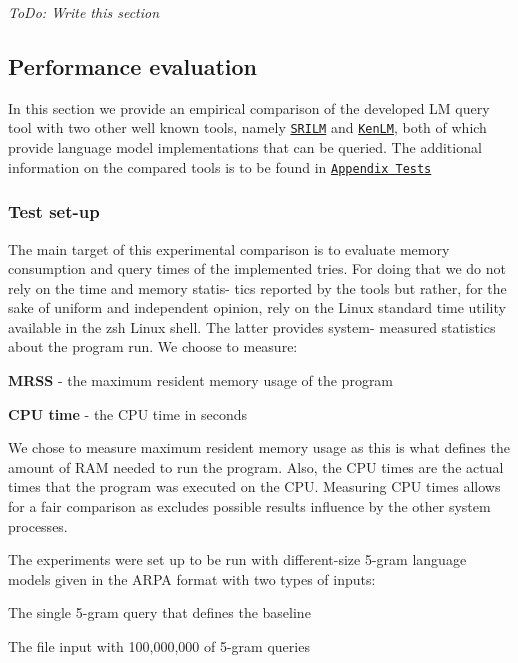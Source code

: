 {\itshape To\+Do\+: Write this section}

\subsection*{Performance evaluation}

In this section we provide an empirical comparison of the developed L\+M query tool with two other well known tools, namely \href{http://www.speech.sri.com/projects/srilm/}{\tt S\+R\+I\+L\+M} and \href{https://kheafield.com/code/kenlm/}{\tt Ken\+L\+M}, both of which provide language model implementations that can be queried. The additional information on the compared tools is to be found in \href{#appendix-tests}{\tt Appendix Tests}

\subsubsection*{Test set-\/up}

The main target of this experimental comparison is to evaluate memory consumption and query times of the implemented tries. For doing that we do not rely on the time and memory statis-\/ tics reported by the tools but rather, for the sake of uniform and independent opinion, rely on the Linux standard time utility available in the {\ttfamily zsh} Linux shell. The latter provides system-\/ measured statistics about the program run. We choose to measure\+:


\begin{DoxyItemize}
\item {\bfseries M\+R\+S\+S} -\/ the maximum resident memory usage of the program
\item {\bfseries C\+P\+U time} -\/ the C\+P\+U time in seconds
\end{DoxyItemize}

We chose to measure maximum resident memory usage as this is what defines the amount of R\+A\+M needed to run the program. Also, the C\+P\+U times are the actual times that the program was executed on the C\+P\+U. Measuring C\+P\+U times allows for a fair comparison as excludes possible results influence by the other system processes.

The experiments were set up to be run with different-\/size 5-\/gram language models given in the A\+R\+P\+A format with two types of inputs\+:


\begin{DoxyEnumerate}
\item The single 5-\/gram query that defines the baseline
\item The file input with 100,000,000 of 5-\/gram queries
\end{DoxyEnumerate}

